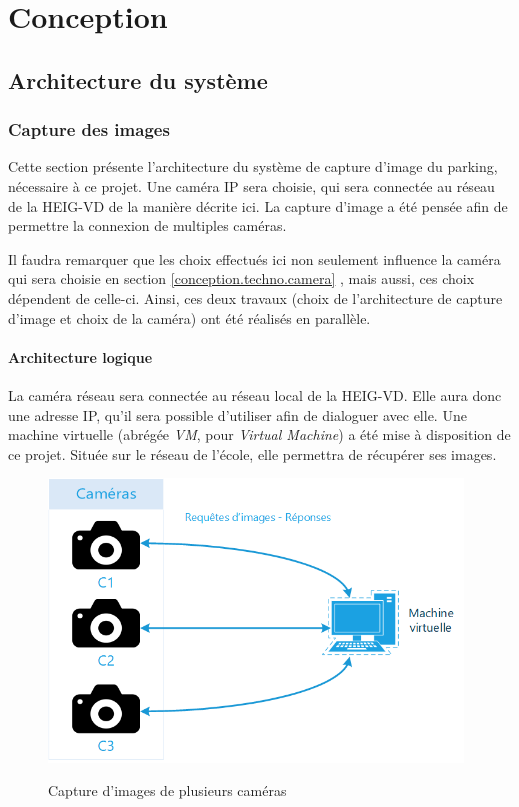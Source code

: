 \chapter{Conception}


\section{Architecture du système}\label{conception.architecture}


\subsection{Capture des images}
Cette section présente l'architecture du système de capture d'image du parking, nécessaire à ce projet. Une caméra IP sera choisie, qui sera connectée au réseau de la HEIG-VD de la manière décrite ici. La capture d'image a été pensée afin de permettre la connexion de multiples caméras.

Il faudra remarquer que les choix effectués ici non seulement influence la caméra qui sera choisie en section \ref{conception.techno.camera} , mais aussi, ces choix dépendent de celle-ci. Ainsi, ces deux travaux (choix de l'architecture de capture d'image et choix de la caméra) ont été réalisés en parallèle.

\subsubsection{Architecture logique}

La caméra réseau sera connectée au réseau local de la HEIG-VD. Elle aura donc une adresse IP, qu'il sera possible d'utiliser afin de dialoguer avec elle. Une machine virtuelle (abrégée \textit{VM}, pour \textit{Virtual Machine}) a été mise à disposition de ce projet. Située sur le réseau de l'école, elle permettra de récupérer ses images.

\begin{figure}[!h]
    \includegraphics[width=110mm]{img/conception/logic_arch.png}
    \label{fig:capture_cameras}
    \centering
    \caption{Capture d'images de plusieurs caméras}
\end{figure}

